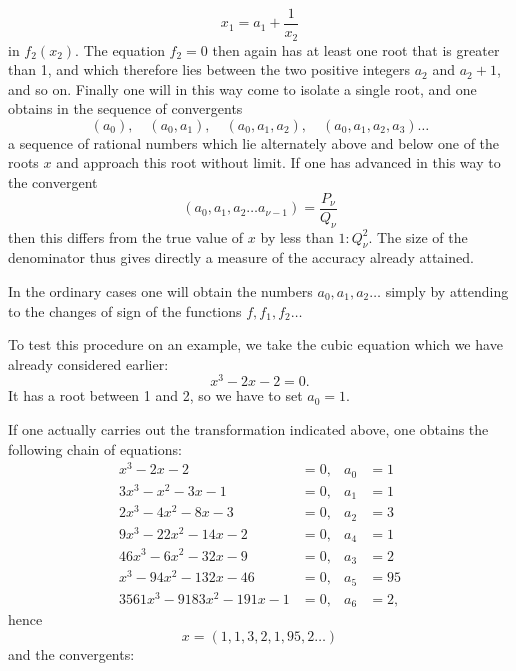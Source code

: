 \[
x_1 = a_1 + \frac{1}{x_2}
\]
in $f_2(x_2)$. The equation $f_2 = 0$ then again has at least
one root that is greater than 1, and which therefore lies between
the two positive integers $a_2$ and $a_2 + 1$, and so on.
Finally one will in this way come to isolate a single
root, and one obtains in the sequence of convergents
\[
(a_0), \quad (a_0, a_1), \quad (a_0, a_1, a_2), \quad (a_0, a_1, a_2, a_3) \ldots
\]
a sequence of rational numbers which lie alternately above and below
one of the roots $x$ and approach this root without limit.
If one has advanced in this way to the convergent
\[
(a_0, a_1, a_2 \ldots a_{\nu-1}) = \frac{P_\nu}{Q_\nu}
\]
then this differs from the true value
of $x$ by less than $1 : Q_\nu^2$. The size of the denominator thus gives
directly a measure of the accuracy already attained.

In the ordinary cases one will obtain the numbers $a_0, a_1, a_2 \ldots$
simply by attending to the changes of sign of the
functions $f, f_1, f_2 \ldots$

To test this procedure on an example, we take
the cubic equation which we have already considered
earlier:
\[
x^3 - 2x - 2 = 0.
\]
It has a root between 1 and 2, so we have to set $a_0 = 1$.

If one actually carries out the transformation indicated above,
one obtains the following chain of equations:
\[
\begin{aligned}
x^3 - 2x - 2 &= 0, & a_0 &= 1\\
3x^3 - x^2 - 3x - 1 &= 0, & a_1 &= 1\\
2x^3 - 4x^2 - 8x - 3 &= 0, & a_2 &= 3\\
9x^3 - 22x^2 - 14x - 2 &= 0, & a_4 &= 1\\ %
46x^3 - 6x^2 - 32x - 9 &= 0, & a_3 &= 2\\
x^3 - 94x^2 - 132x - 46 &= 0, & a_5 &= 95\\
3561x^3 - 9183x^2 - 191x - 1 &= 0, & a_6 &= 2,
\end{aligned}
\]
hence
\[
x = (1, 1, 3, 2, 1, 95, 2 \ldots)
\]
and the convergents:
